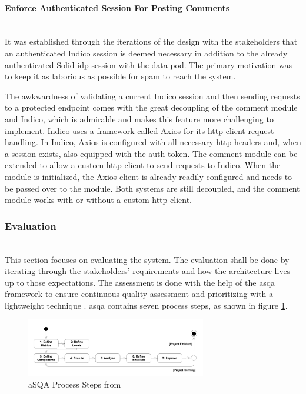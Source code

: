\paragraph{Enforce Authenticated Session For Posting Comments}\mbox{}\\

It was established through the iterations of the design with the stakeholders that an authenticated Indico session is deemed necessary in addition to the already authenticated Solid \gls{idp} session with the data pod. The primary motivation was to keep it as laborious as possible for spam to reach the system.

The awkwardness of validating a current Indico session and then sending requests to a protected endpoint comes with the great decoupling of the comment module and Indico, which is admirable and makes this feature more challenging to implement. Indico uses a framework called Axios \cite{axios} for its \gls{http} client request handling. In Indico, Axios is configured with all necessary \gls{http} headers and, when a session exists, also equipped with the auth-token. The comment module can be extended to allow a custom \gls{http} client to send requests to Indico. When the module is initialized, the Axios client is already readily configured and needs to be passed over to the module. Both systems are still decoupled, and the comment module works with or without a custom \gls{http} client.
\vspace{0.5cm}
\subsubsection{Evaluation}\label{section:poc1-evaluation}\mbox{}\\

This section focuses on evaluating the system. The evaluation shall be done by iterating through the stakeholders' requirements and how the architecture lives up to those expectations. The assessment is done with the help of the \gls{asqa} framework to ensure continuous quality assessment and prioritizing with a lightweight technique \cite{asqa-paper}. \gls{asqa} contains seven process steps, as shown in figure \ref{fig:asqa-process-steps}.

\begin{figure}[!ht]
    \centering
    \includegraphics[width=0.7\textwidth]{thesis/latex/assets/asqa-process-steps.png}
    \caption{aSQA Process Steps from \cite{asqa-paper}}
    \label{fig:asqa-process-steps}
\end{figure}

